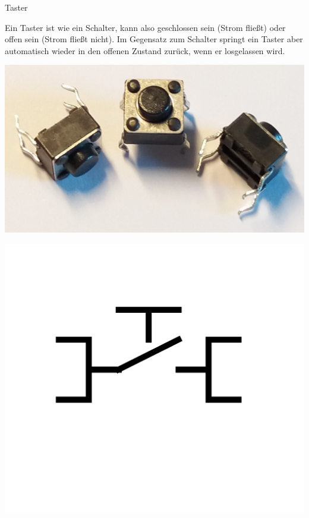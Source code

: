 \bigskip
\begin{zsfg}{Taster}
	\begin{minipage}{0.7\textwidth}
		Ein Taster ist wie ein Schalter, kann also geschlossen sein (Strom fließt) oder offen sein (Strom fließt nicht). Im Gegensatz zum Schalter springt ein Taster aber automatisch wieder in den offenen Zustand zurück, wenn er losgelassen wird.
	\end{minipage}
	\hfill
	\begin{minipage}{0.28\textwidth}
		\begin{minipage}{0.63\textwidth}
			\centering
			\includegraphics[width=\textwidth]{./pics/taster.jpg}
		\end{minipage}
		\hfill
		\begin{minipage}{0.33\textwidth}
			\centering
			\includegraphics[width=\textwidth]{./Zeichnungen/taster-schaltsymbol.png}
		\end{minipage}
	\end{minipage}		
\end{zsfg}


